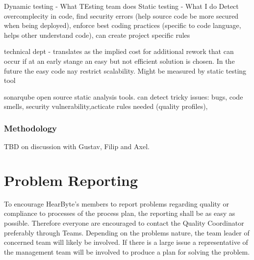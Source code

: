 \documentclass{article}
\begin{document}
	Dynamic testing - What TEsting team does
	Static testing - What I do
		Detect overcomplecity in code, find security errors (help source code be more secured when being deployed), enforce best coding practices (specific to code language, helps other understand code), can create project specific rules
		
	technical dept - translates as the implied cost for additional rework that can occur if at an early stange an easy but not efficient solution is chosen. In the future the easy code nay restrict scalability. Might be measured by static testing tool
	
	sonarqube open source static analysis tools. 
	can detect tricky issues: bugs, code smells, security vulnerability,acticate rules needed (quality profiles),  
	\subsubsection{Methodology}
	TBD on discussion with Gustav, Filip and Axel.
	
		
	 

	\clearpage
	\section{Problem Reporting}
	To encourage HearByte's members to report problems regarding quality or compliance to processes of the process plan, the reporting shall be as easy as possible. Therefore everyone are encouraged to contact the Quality Coordinator preferably through Teams. Depending on the problems nature, the team leader of concerned team will likely be involved. If there is a large issue a representative of the management team will be involved to produce a plan for solving the problem.
	
	
\end{document}
